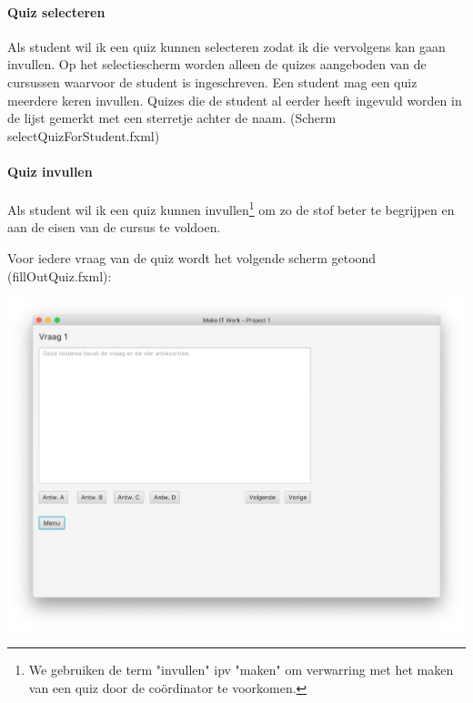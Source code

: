 \documentclass[11pt, a4paper]{article}
\begin{document}
\paragraph{Quiz selecteren}
Als student wil ik een quiz kunnen selecteren zodat ik die vervolgens kan gaan invullen.
Op het selectiescherm worden alleen de quizes aangeboden van de cursussen waarvoor de student is ingeschreven.
Een student mag een quiz meerdere keren invullen.
Quizes die de student al eerder heeft ingevuld worden in de lijst gemerkt met een sterretje achter de naam.
(Scherm selectQuizForStudent.fxml)

\paragraph{Quiz invullen}
Als student wil ik een quiz kunnen invullen\footnote{We gebruiken de term "invullen" ipv "maken" om verwarring met het maken van een quiz door de co\"ordinator te voorkomen.} om zo de stof beter te begrijpen en aan de eisen van de cursus te voldoen.

Voor iedere vraag van de quiz wordt het volgende scherm getoond (fillOutQuiz.fxml):

\begin{center}
\includegraphics[width=\linewidth]{Screenshot_fillOutQuiz.png}
\end{center}
\end{document}
